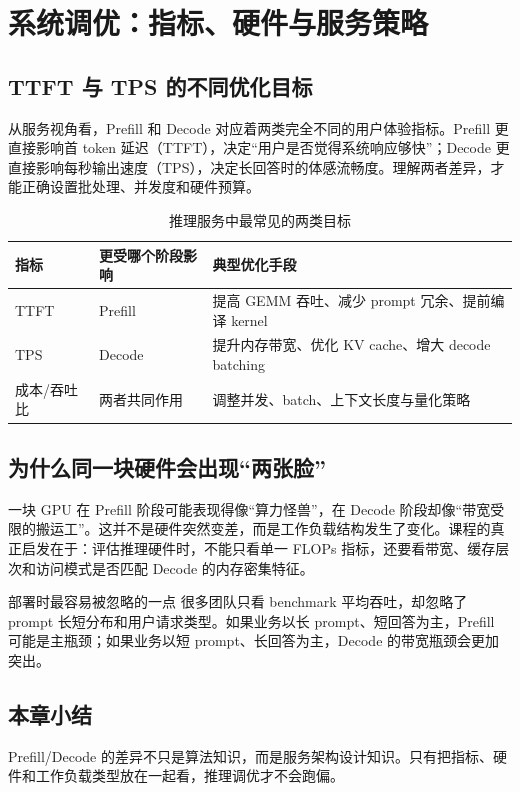 \section{系统调优：指标、硬件与服务策略}

\subsection{TTFT 与 TPS 的不同优化目标}
从服务视角看，Prefill 和 Decode 对应着两类完全不同的用户体验指标。Prefill 更直接影响首 token 延迟（TTFT），决定“用户是否觉得系统响应够快”；Decode 更直接影响每秒输出速度（TPS），决定长回答时的体感流畅度。理解两者差异，才能正确设置批处理、并发度和硬件预算。

\begin{table}[H]
\centering
\caption{推理服务中最常见的两类目标}
\begin{tabular}{p{3.2cm}p{4.8cm}p{4.5cm}}
\toprule
指标 & 更受哪个阶段影响 & 典型优化手段 \\
\midrule
TTFT & Prefill & 提高 GEMM 吞吐、减少 prompt 冗余、提前编译 kernel \\
TPS & Decode & 提升内存带宽、优化 KV cache、增大 decode batching \\
成本/吞吐比 & 两者共同作用 & 调整并发、batch、上下文长度与量化策略 \\
\bottomrule
\end{tabular}
\end{table}

\subsection{为什么同一块硬件会出现“两张脸”}
一块 GPU 在 Prefill 阶段可能表现得像“算力怪兽”，在 Decode 阶段却像“带宽受限的搬运工”。这并不是硬件突然变差，而是工作负载结构发生了变化。课程的真正启发在于：评估推理硬件时，不能只看单一 FLOPs 指标，还要看带宽、缓存层次和访问模式是否匹配 Decode 的内存密集特征。

\begin{knowledgebox}{部署时最容易被忽略的一点}
很多团队只看 benchmark 平均吞吐，却忽略了 prompt 长短分布和用户请求类型。如果业务以长 prompt、短回答为主，Prefill 可能是主瓶颈；如果业务以短 prompt、长回答为主，Decode 的带宽瓶颈会更加突出。
\end{knowledgebox}

\subsection{本章小结}
Prefill/Decode 的差异不只是算法知识，而是服务架构设计知识。只有把指标、硬件和工作负载类型放在一起看，推理调优才不会跑偏。

\newpage
